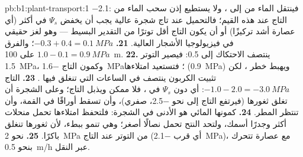 \begin{solution}{pb:b1:plant-transport:1}
\qty{-2.1}{}: فينتقل الماء من  إلى ، ولا يستطيع 
إذن سحب الماء من  التاج عند هذه القيم؛ فالتحميل عند تاج شجرة
عالية يجب أن يخفض $\Psi_s$ في  أكثر (أي عصارة أشد تركيزًا)
أو أن يكون  التاج أقل توترًا من التقدير البسيط --- وهو لغز
حقيقي في فيزيولوجيا الأشجار العالية.
\textbf{21.} $-0.3 + 0.4 = \qty{0.1}{MPa}$؛ والفرق $1.0 - 0.1 =
\qty{0.9}{MPa}$ على \qty{100}{m}.
\textbf{22.} ينتصف الاحتكاك إلى \qty{0.5}{}: فيصير التوتر
\qty{1.5}{MPa}، وكمون التاج \qty{-1.6}{MPa}؛ فتستعيد 
امتلاءها (\qty{0.9}{MPa}) ويهبط خطر ، لكن تثبيت الكربون
ينتصف في الساعات التي تنغلق فيها .
\textbf{23.} التاج $-1.0 - 2.0 = \qty{-3.0}{MPa}$: أي دون $\Psi_s$
في ، فلا  ممكن ويذبل التاج؛ وعلى الشجرة أن تغلق
ثغورها (فيرتفع التاج إلى نحو \qty{-2.5}{}،  صفري)، وأن
تسقط أوراقًا في القمة، وأن تنتظر المطر.
\textbf{24.} كمونها المائي هو الأدنى في الشجرة: فلتحفظ امتلاءها
تحمل منحلات أكثر وجدرًا أسمك، ولتحد النتح تحمل نصالًا أصغر؛ وهي
تنمو ببطء، لأن ثغورها تنغلق باكرًا.
\textbf{25.} نحو \qty{2}{MPa} من التوتر عند التاج (أي  قرب
\qty{-2.1}{MPa})، مع عصارة تتحرك بنحو \qty{0.5}{m/h} عبر 
النقل.
\end{solution}
